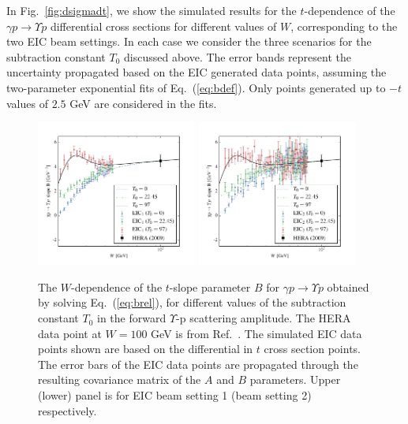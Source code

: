 \documentclass[prd,amsmath,%
twocolumn,floatfix,amssymb, preprintnumbers, nofootinbib, superscriptaddress]{revtex4}
\begin{document}
In Fig.~\ref{fig:dsigmadt}, we show the simulated results for the $t$-dependence of the $\gamma p \to \Upsilon p$ 
differential cross sections for different values of $W$,  
corresponding to the two EIC beam settings. In each case we consider the three scenarios for the subtraction constant $T_0$ discussed above. 
The error bands represent the uncertainty propagated based on the EIC generated data points, assuming the two-parameter exponential fits of Eq.~(\ref{eq:bdef}). 
Only points generated up to $-t$ values of $2.5$ GeV are considered in the fits.


\begin{figure}[h]
\includegraphics[width=0.47\textwidth]{b_slope_eic1.pdf}
\includegraphics[width=0.47\textwidth]{b_slope_eic2.pdf}
\caption{
The $W$-dependence of the $t$-slope parameter $B$ for $\gamma p \to \Upsilon p$ obtained by solving Eq.~(\ref{eq:brel}),
for different values of the subtraction constant $T_0$ in the forward $\Upsilon$-p scattering amplitude.
The HERA data point at $W=100$ GeV is from Ref.~\cite{Chekanov:2009zz}. 
The simulated EIC data points shown are based on the differential in $t$ cross section points. 
The error bars of the EIC data points are propagated through the resulting covariance matrix of the $A$ and $B$ parameters.
Upper (lower) panel is for EIC beam setting 1 (beam setting 2) respectively.}
\label{fig:bslopeeic}
\end{figure}
\end{document}

